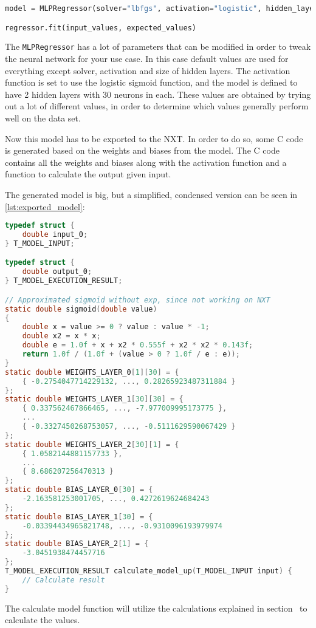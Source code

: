 \begin{lstlisting}[language=python,label={lst:mlpregressor},caption={Training a MLPRegressor with scikit}]
model = MLPRegressor(solver="lbfgs", activation="logistic", hidden_layer_sizes=(30, 30))

regressor.fit(input_values, expected_values)
\end{lstlisting}

The \texttt{MLPRegressor} has a lot of parameters that can be modified in order to tweak the neural network for your use case.
In this case default values are used for everything except solver, activation and size of hidden layers.
The activation function is set to use the logistic sigmoid function, and the model is defined to have 2 hidden layers with 30 neurons in each.
These values are obtained by trying out a lot of different values, in order to determine which values generally perform well on the data set.


Now this model has to be exported to the NXT. 
In order to do so, some C code is generated based on the weights and biases from the model.
The C code contains all the weights and biases along with the activation function and a function to calculate the output given input.

The generated model is big, but a simplified, condensed version can be seen in \autoref{lst:exported_model}:


\begin{lstlisting}[language=C,label={lst:exported_model},caption={Autogenerated model for getting power to move up}]
typedef struct {
	double input_0;
} T_MODEL_INPUT;

typedef struct {
	double output_0;
} T_MODEL_EXECUTION_RESULT;

// Approximated sigmoid without exp, since not working on NXT
static double sigmoid(double value)
{
	double x = value >= 0 ? value : value * -1;
	double x2 = x * x;
	double e = 1.0f + x + x2 * 0.555f + x2 * x2 * 0.143f;
	return 1.0f / (1.0f + (value > 0 ? 1.0f / e : e));
}
static double WEIGHTS_LAYER_0[1][30] = {
	{ -0.2754047714229132, ..., 0.28265923487311884 }
};
static double WEIGHTS_LAYER_1[30][30] = {
	{ 0.337562467866465, ..., -7.977009995173775 },
	...
	{ -0.3327450268753057, ..., -0.5111629590067429 }
};
static double WEIGHTS_LAYER_2[30][1] = {
	{ 1.0582144881157733 },
	...
	{ 8.686207256470313 }
};
static double BIAS_LAYER_0[30] = {
	-2.163581253001705, ..., 0.4272619624684243
};
static double BIAS_LAYER_1[30] = {
	-0.03394434965821748, ..., -0.9310096193979974
};
static double BIAS_LAYER_2[1] = {
	-3.0451938474457716
};
T_MODEL_EXECUTION_RESULT calculate_model_up(T_MODEL_INPUT input) {
	// Calculate result
}

\end{lstlisting}

The calculate model function will utilize the calculations explained in section~ to calculate the values.


